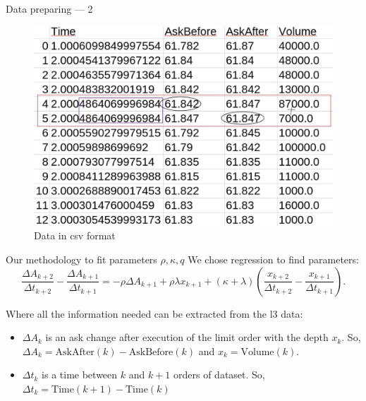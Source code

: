 \documentclass[aspectratio=169]{beamer}
\begin{document}
\begin{frame}{Data preparing --- 2}
    \begin{figure}
        \includegraphics[scale=0.31]{figs/datscsv.jpg}
        \caption{Data in csv format}
        \label{fig:mvslim}
    \end{figure}
\end{frame}


\begin{frame}{Our methodology to fit parameters $\rho, \kappa, q$}
    We chose regression to find parameters:                                                                                                                                                                                                                                                                                                                                                                                       
            \begin{equation*}
                \frac{\Delta A_{k+2}}{\Delta t_{k+2}} - \frac{\Delta A_{k+1}}{\Delta t_{k+1}} 
        = - \rho \Delta A_{k+1} + \rho \lambda x_{k+1} + (\kappa + \lambda) (\frac{x_{k+2}}{\Delta t_{k+2}} - \frac{x_{k+1}}{\Delta t_{k+1}}).
            \end{equation*}

        Where all the information needed can be extracted from the l3 data: 
        \begin{itemize}
            \item $\Delta A_{k}$ is an ask change after execution of the limit order with the depth $x_k$.
            So, $\Delta A_{k} = \textrm{AskAfter}(k) - \textrm{AskBefore}(k)$ and $x_k = \textrm{Volume}(k)$.
            \item $\Delta t_{k}$ is a time between $k$ and $k + 1$ orders of dataset. So, $\Delta t_{k} = \textrm{Time}(k+1) - \textrm{Time}(k)$
        \end{itemize}
\end{frame}
\end{document}
